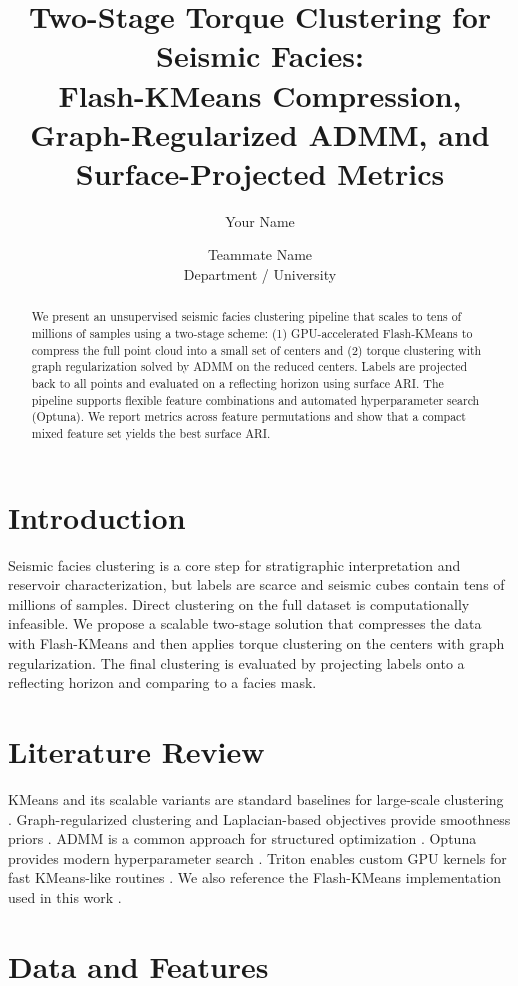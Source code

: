 \documentclass{article}
\title{Two-Stage Torque Clustering for Seismic Facies:\\Flash-KMeans Compression, Graph-Regularized ADMM, and Surface-Projected Metrics}
\author{Your Name \and Teammate Name \\
Department / University}
\date{}
\begin{document}
\maketitle

\begin{abstract}
We present an unsupervised seismic facies clustering pipeline that scales to tens of millions of samples using a two-stage scheme: (1) GPU-accelerated Flash-KMeans to compress the full point cloud into a small set of centers and (2) torque clustering with graph regularization solved by ADMM on the reduced centers. Labels are projected back to all points and evaluated on a reflecting horizon using surface ARI. The pipeline supports flexible feature combinations and automated hyperparameter search (Optuna). We report metrics across feature permutations and show that a compact mixed feature set yields the best surface ARI.
\end{abstract}

\section{Introduction}
Seismic facies clustering is a core step for stratigraphic interpretation and reservoir characterization, but labels are scarce and seismic cubes contain tens of millions of samples. Direct clustering on the full dataset is computationally infeasible. We propose a scalable two-stage solution that compresses the data with Flash-KMeans and then applies torque clustering on the centers with graph regularization. The final clustering is evaluated by projecting labels onto a reflecting horizon and comparing to a facies mask.

\section{Literature Review}
KMeans and its scalable variants are standard baselines for large-scale clustering \citep{macqueen1967, lloyd1982, arthur2007}. Graph-regularized clustering and Laplacian-based objectives provide smoothness priors \citep{chung1997}. ADMM is a common approach for structured optimization \citep{boyd2011}. Optuna provides modern hyperparameter search \citep{akiba2019}. Triton enables custom GPU kernels for fast KMeans-like routines \citep{tillet2019}. We also reference the Flash-KMeans implementation used in this work \citep{yang2026flash}.

\section{Data and Features}
\end{document}
